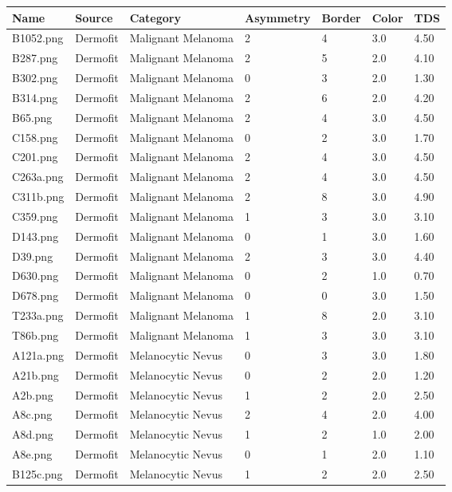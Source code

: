 \begin{longtable}{ | l | l | l | l | l | l | l |}
\hline
Name & Source & Category & Asymmetry & Border & Color & TDS \\ \hline
B1052.png & Dermofit & Malignant Melanoma & 2 & 4 & 3.0 & 4.50 \\ 
B287.png & Dermofit & Malignant Melanoma & 2 & 5 & 2.0 & 4.10 \\ 
B302.png & Dermofit & Malignant Melanoma & 0 & 3 & 2.0 & 1.30 \\ 
B314.png & Dermofit & Malignant Melanoma & 2 & 6 & 2.0 & 4.20 \\ 
B65.png & Dermofit & Malignant Melanoma & 2 & 4 & 3.0 & 4.50 \\ 
C158.png & Dermofit & Malignant Melanoma & 0 & 2 & 3.0 & 1.70 \\ 
C201.png & Dermofit & Malignant Melanoma & 2 & 4 & 3.0 & 4.50 \\ 
C263a.png & Dermofit & Malignant Melanoma & 2 & 4 & 3.0 & 4.50 \\ 
C311b.png & Dermofit & Malignant Melanoma & 2 & 8 & 3.0 & 4.90 \\ 
C359.png & Dermofit & Malignant Melanoma & 1 & 3 & 3.0 & 3.10 \\ 
D143.png & Dermofit & Malignant Melanoma & 0 & 1 & 3.0 & 1.60 \\ 
D39.png & Dermofit & Malignant Melanoma & 2 & 3 & 3.0 & 4.40 \\ 
D630.png & Dermofit & Malignant Melanoma & 0 & 2 & 1.0 & 0.70 \\ 
D678.png & Dermofit & Malignant Melanoma & 0 & 0 & 3.0 & 1.50 \\ 
T233a.png & Dermofit & Malignant Melanoma & 1 & 8 & 2.0 & 3.10 \\ 
T86b.png & Dermofit & Malignant Melanoma & 1 & 3 & 3.0 & 3.10 \\ 
A121a.png & Dermofit & Melanocytic Nevus & 0 & 3 & 3.0 & 1.80 \\ 
A21b.png & Dermofit & Melanocytic Nevus & 0 & 2 & 2.0 & 1.20 \\ 
A2b.png & Dermofit & Melanocytic Nevus & 1 & 2 & 2.0 & 2.50 \\ 
A8c.png & Dermofit & Melanocytic Nevus & 2 & 4 & 2.0 & 4.00 \\ 
A8d.png & Dermofit & Melanocytic Nevus & 1 & 2 & 1.0 & 2.00 \\ 
A8e.png & Dermofit & Melanocytic Nevus & 0 & 1 & 2.0 & 1.10 \\ 
B125c.png & Dermofit & Melanocytic Nevus & 1 & 2 & 2.0 & 2.50 \\ 

\end{longtable}
